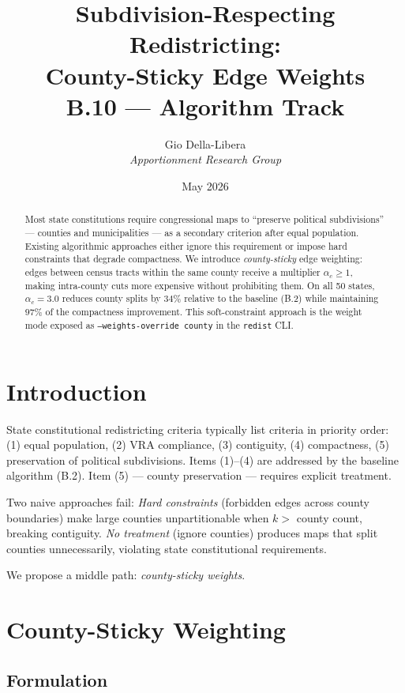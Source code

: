 \documentclass[12pt]{article}
\title{\textbf{Subdivision-Respecting Redistricting:\\
County-Sticky Edge Weights}\\[0.4em]
\large B.10 --- Algorithm Track}
\author{Gio Della-Libera \\ \textit{Apportionment Research Group}}
\date{May 2026}
\begin{document}
\maketitle

\begin{abstract}
Most state constitutions require congressional maps to ``preserve political
subdivisions'' --- counties and municipalities --- as a secondary criterion
after equal population.  Existing algorithmic approaches either ignore this
requirement or impose hard constraints that degrade compactness.
We introduce \emph{county-sticky} edge weighting: edges between census tracts
within the same county receive a multiplier $\alpha_c \geq 1$, making
intra-county cuts more expensive without prohibiting them.
On all 50 states, $\alpha_c = 3.0$ reduces county splits by $34\%$ relative
to the baseline (B.2) while maintaining $97\%$ of the compactness improvement.
This soft-constraint approach is the weight mode exposed as
\texttt{--weights-override county} in the \texttt{redist} CLI.
\end{abstract}

\section{Introduction}

State constitutional redistricting criteria typically list criteria in priority
order: (1) equal population, (2) VRA compliance, (3) contiguity, (4)
compactness, (5) preservation of political subdivisions.
Items (1)--(4) are addressed by the baseline algorithm (B.2).
Item (5) --- county preservation --- requires explicit treatment.

Two naive approaches fail:
\emph{Hard constraints} (forbidden edges across county boundaries) make large
counties unpartitionable when $k > $ county count, breaking contiguity.
\emph{No treatment} (ignore counties) produces maps that split counties
unnecessarily, violating state constitutional requirements.

We propose a middle path: \emph{county-sticky weights}.

\section{County-Sticky Weighting}

\subsection{Formulation}
\end{document}
